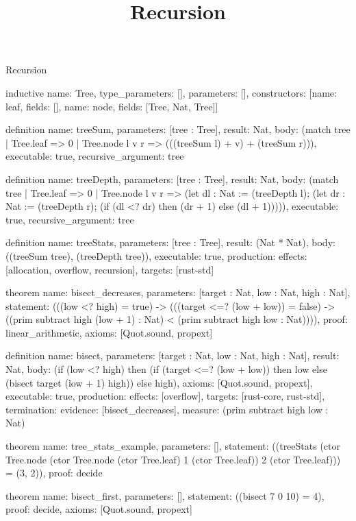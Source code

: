 \begin{lexlean}{Recursion}
\title{Recursion}
\begin{semanticmodule}
inductive{
  name: Tree,
  type_parameters: [],
  parameters: [],
  constructors: [{name: leaf, fields: []}, {name: node, fields: [Tree, Nat, Tree]}]
}

definition{
  name: treeSum,
  parameters: [tree : Tree],
  result: Nat,
  body: (match tree | Tree.leaf => 0 | Tree.node l v r => (((treeSum l) + v) + (treeSum r))),
  executable: true,
  recursive_argument: tree
}

definition{
  name: treeDepth,
  parameters: [tree : Tree],
  result: Nat,
  body: (match tree
    | Tree.leaf => 0
    | Tree.node l v r => (let dl : Nat := (treeDepth l); (let dr : Nat := (treeDepth r); (if (dl <? dr) then (dr + 1) else (dl + 1))))),
  executable: true,
  recursive_argument: tree
}

definition{
  name: treeStats,
  parameters: [tree : Tree],
  result: (Nat * Nat),
  body: ((treeSum tree), (treeDepth tree)),
  executable: true,
  production: {effects: [allocation, overflow, recursion], targets: [rust-std]}
}

theorem{
  name: bisect_decreases,
  parameters: [target : Nat, low : Nat, high : Nat],
  statement: (((low <? high) = true) -> (((target <=? (low + low)) = false) -> ((prim subtract high (low + 1) : Nat) < (prim subtract high low : Nat)))),
  proof: linear_arithmetic{},
  axioms: [Quot.sound, propext]
}

definition{
  name: bisect,
  parameters: [target : Nat, low : Nat, high : Nat],
  result: Nat,
  body: (if (low <? high) then (if (target <=? (low + low)) then low else (bisect target (low + 1) high)) else high),
  axioms: [Quot.sound, propext],
  executable: true,
  production: {effects: [overflow], targets: [rust-core, rust-std]},
  termination: {evidence: [bisect_decreases], measure: (prim subtract high low : Nat)}
}

theorem{
  name: tree_stats_example,
  parameters: [],
  statement: ((treeStats (ctor Tree.node (ctor Tree.node (ctor Tree.leaf) 1 (ctor Tree.leaf)) 2 (ctor Tree.leaf))) = (3, 2)),
  proof: decide{}
}

theorem{
  name: bisect_first,
  parameters: [],
  statement: ((bisect 7 0 10) = 4),
  proof: decide{},
  axioms: [Quot.sound, propext]
}
\end{semanticmodule}
\end{lexlean}
